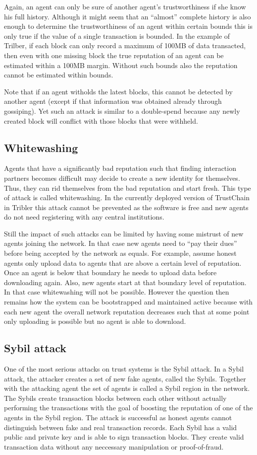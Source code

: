 Again, an agent can only be sure of another agent's trustworthiness if she know his full history. 
Although it might seem that an ``almost'' complete history is also enough to determine the trustworthiness
of an agent within certain bounds this is only true if the value of a single transaction is bounded.
In the example of Trilber, if each block can only record a maximum of 100MB of data transacted, then 
even with one missing block the true reputation of an agent can be estimated within a 100MB margin.
Without such bounds also the reputation cannot be estimated within bounds. 

Note that if an agent witholds the latest blocks, this cannot be detected by another agent (except
if that information was obtained already through gossiping). Yet such an attack is similar to a
double-spend because any newly created block will conflict with those blocks that were withheld.

\subsection{Whitewashing}
Agents that have a significantly bad reputation such that finding interaction partners becomes difficult may decide to create a new 
identity for themselves. Thus, they can rid themselves from the bad reputation and start fresh. This 
type of attack is called whitewashing. In the currently deployed version of TrustChain in Tribler 
this attack cannot be prevented as the software is free and new agents do not need registering with
any central institutions.

Still the impact of such attacks can be limited by having some mistrust of new agents joining the 
network. In that case new agents need to ``pay their dues'' before being accepted by the network 
as equals. For example, assume honest agents only upload data to agents that are above a certain level
of reputation. Once an agent is below that boundary he needs to upload data before downloading again.
Also, new agents start at that boundary level of reputation. In that case whitewashing will not be
possible. However the question then remains how the system can be bootstrapped and maintained
active because with each new agent the overall network reputation decreases such that at some point
only uploading is possible but no agent is able to download.

\subsection{Sybil attack}
One of the most serious attacks on trust systems is the Sybil attack. In a Sybil attack, the attacker
creates a set of new fake agents, called the Sybils. Together with the attacking agent the set of 
agents is called a Sybil region in the network. The Sybils create transaction blocks  
between each other without actually performing the transactions with the goal of boosting the 
reputation of one of the agents in the Sybil region. The attack is successful as honest agents 
cannot distinguish between fake and real transaction records. Each Sybil has a valid public and private
key and is able to sign transaction blocks. They create valid transaction data without any neccessary
manipulation or proof-of-fraud.

